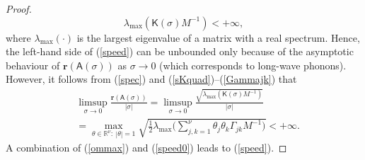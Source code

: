\documentclass[letterpaper, 10pt, conference]{ieeeconf}  %
\def\mR{\mathbb{R}}    %
\def\br{\mathbf{r}}
\def\fS{\mathfrak{S}}
\def\sK{\mathsf{K}}
\def\sA{\mathsf{A}}
\begin{document}
\begin{proof}
\begin{equation}
{  \lambda_{\max}(\sK(\sigma)M^{-1})}
  <+\infty,
\end{equation}
where $\lambda_{\max}(\cdot)$ is the largest eigenvalue of a matrix with a real spectrum. Hence, the left-hand side of (\ref{speed}) can be unbounded only because of the asymptotic behaviour of $\br(\sA(\sigma))$ as $\sigma \to 0$  (which corresponds to long-wave phonons). However, it follows from (\ref{spec}) and (\ref{sKquad})--(\ref{Gammajk}) that
\begin{align}
\nonumber
  &\limsup_{\sigma\to 0}
  \frac{\br(\sA(\sigma))}{|\sigma|}
  =
  \limsup_{\sigma\to 0}
  \frac{\sqrt{\lambda_{\max}(\sK(\sigma)M^{-1})}}{|\sigma|}  \\
\label{speed0}
  & =
  \max_{\theta\in \mR^\nu:\ |\theta| = 1}
  \sqrt{
  \frac{1}{2}
  \lambda_{\max}
  \Big(
      \sum_{j,k=1}^\nu
    \theta_j \theta_k
    \Gamma_{jk}
    M^{-1}
    \Big)
  }
   <+\infty.
\end{align}
A combination of (\ref{ommax}) and (\ref{speed0}) leads to
(\ref{speed}).
\end{proof}
\end{document}
